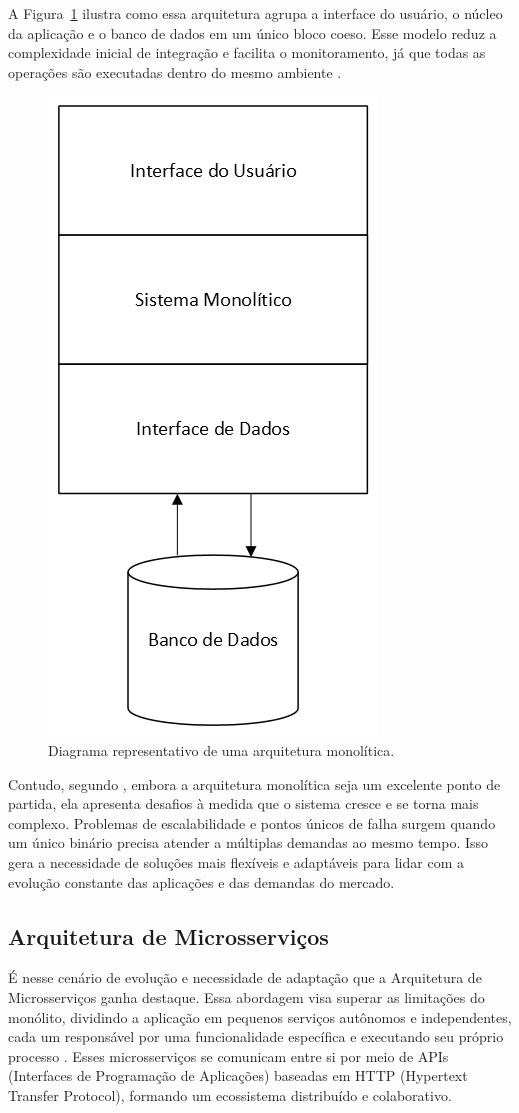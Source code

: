 A Figura~\ref{fig:monolito-diagrama} ilustra como essa arquitetura agrupa a interface do usuário, o núcleo da aplicação e o banco de dados em um único bloco coeso. Esse modelo reduz a complexidade inicial de integração e facilita o monitoramento, já que todas as operações são executadas dentro do mesmo ambiente \citep{Salaheddin2022}.

\begin{figure}[H]
\centering
\includegraphics[width=0.3\linewidth]{imagens/monolito-diagrama.png}
\caption{Diagrama representativo de uma arquitetura monolítica.}
\label{fig:monolito-diagrama}
\end{figure}

Contudo, segundo \citep{fowler2015monolithfirst}, embora a arquitetura monolítica seja um excelente ponto de partida, ela apresenta desafios à medida que o sistema cresce e se torna mais complexo. Problemas de escalabilidade e pontos únicos de falha surgem quando um único binário precisa atender a múltiplas demandas ao mesmo tempo. Isso gera a necessidade de soluções mais flexíveis e adaptáveis para lidar com a evolução constante das aplicações e das demandas do mercado.

\subsection{Arquitetura de Microsserviços}

É nesse cenário de evolução e necessidade de adaptação que a Arquitetura de Microsserviços ganha destaque. Essa abordagem visa superar as limitações do monólito, dividindo a aplicação em pequenos serviços autônomos e independentes, cada um responsável por uma funcionalidade específica e executando seu próprio processo \citep{martinfowler2014microservices}. Esses microsserviços se comunicam entre si por meio de APIs (Interfaces de Programação de Aplicações) baseadas em HTTP (Hypertext Transfer Protocol), formando um ecossistema distribuído e colaborativo.

